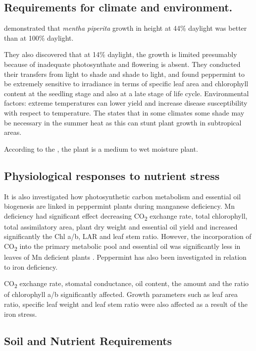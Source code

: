 \subsection*{Requirements for climate and environment.}

\textcite{virzo1980adaptability} demonstrated that \textit{mentha piperita} growth in height at 44\% daylight was better than at 100\% daylight.

They also discovered that at 14\% daylight, the growth is limited presumably because of inadequate photosynthate and flowering is absent. They conducted their transfers from light to shade and shade to light, and found peppermint to be extremely sensitive to irradiance in terms of specific leaf area and chlorophyll content at the seedling stage and also at a late stage of life cycle. Environmental factors: extreme temperatures can lower yield and increase disease susceptibility with respect to temperature. The \textcite{umd2026growing} states that in some climates some shade may be necessary in the summer heat as this can stunt plant growth in subtropical areas.

According to the \textcite{mobot2026piperita}, the plant is a medium to wet moisture plant.

\subsection*{Physiological responses to nutrient stress}

It is also investigated how photosynthetic carbon metabolism and essential oil biogenesis are linked in peppermint plants during manganese deficiency. Mn deficiency had significant effect decreasing CO\textsubscript{2} exchange rate, total chlorophyll, total assimilatory area, plant dry weight and essential oil yield and increased significantly the Chl a/b, LAR and leaf stem ratio. However, the incorporation of CO\textsubscript{2} into the primary metabolic pool and essential oil was significantly less in leaves of Mn deficient plants \parencite{srivastava1994relationship}. Peppermint has also been investigated in relation to iron deficiency.

CO\textsubscript{2} exchange rate, stomatal conductance, oil content, the amount and the ratio of chlorophyll a/b significantly affected. Growth parameters such as leaf area ratio, specific leaf weight and leaf stem ratio \parencite{srivastava1993relation} were also affected as a result of the iron stress.

\subsection*{Soil and Nutrient Requirements}

